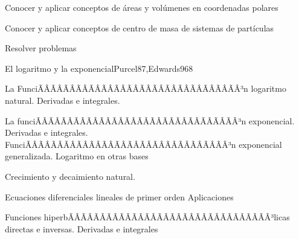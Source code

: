 \begin{sumilla}
\begin{unit}
\begin{objetivos}
	\item Conocer y aplicar conceptos de \'areas y vol\'umenes en coordenadas polares
	\item Conocer y aplicar conceptos de centro de masa de sistemas de part\'iculas
	\item Resolver problemas
\end{objetivos}
\end{unit}


\begin{unit}{El logaritmo y la exponencial}{Purcel87,Edwards96}{8}
\begin{topicos}
	\item La FunciÃÂÃÂÃÂÃÂÃÂÃÂÃÂÃÂÃÂÃÂÃÂÃÂÃÂÃÂÃÂÃÂ³n logaritmo natural. Derivadas e integrales.
	\item La funciÃÂÃÂÃÂÃÂÃÂÃÂÃÂÃÂÃÂÃÂÃÂÃÂÃÂÃÂÃÂÃÂ³n exponencial. Derivadas e integrales. FunciÃÂÃÂÃÂÃÂÃÂÃÂÃÂÃÂÃÂÃÂÃÂÃÂÃÂÃÂÃÂÃÂ³n exponencial  generalizada. Logaritmo en otras bases
	\item Crecimiento y decaimiento natural. 
	\item Ecuaciones diferenciales lineales de primer orden Aplicaciones
	\item Funciones hiperbÃÂÃÂÃÂÃÂÃÂÃÂÃÂÃÂÃÂÃÂÃÂÃÂÃÂÃÂÃÂÃÂ³licas directas e inversas. Derivadas e integrales
\end{topicos}


\end{unit}
\end{sumilla}

